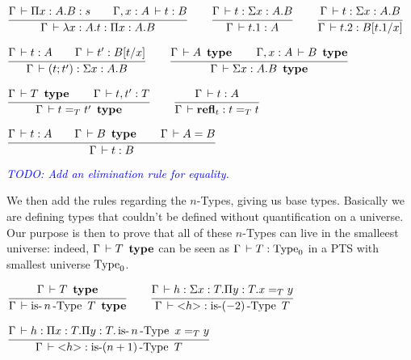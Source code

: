 \documentclass[a4paper,english]{lipics-utf8x}
\newcommand\meta[1]{\noindent\textcolor{blue}{\emph{#1}}}
\begin{document}
  \begin{center}
  \(
    \ru{\Gamma \der \Pi x:A.B : s \qquad
        \Gamma, x:A \der t : B
      }{\Gamma \der \lambda x:A.t : \Pi x:A.B}
    \qquad
    \ru{\Gamma \der t : \Sigma x:A.B
      }{\Gamma \der t.1 : A}
    \qquad
    \ru{\Gamma \der t : \Sigma x:A.B
      }{\Gamma \der t.2 : B[t.1/x]}
  \)
  \end{center}

  \begin{center}
  \(
    \ru{\Gamma \der t : A \qquad
        \Gamma \der t' : B[t/x]
      }{\Gamma \der (t ; t') : \Sigma x:A.B}
    \qquad
    \ru{\Gamma \der A \type \qquad
        \Gamma, x:A \der B \type
      }{\Gamma \der \Sigma x:A.B \type}
  \)
  \end{center}

  \begin{center}
  \(
    \ru{\Gamma \der T \type \qquad
        \Gamma \der t,t' : T
      }{\Gamma \der t =_T t' \type}
    \qquad
    \ru{\Gamma \der t : A
      }{\Gamma \der \refl_t : t =_T t}
  \)
  \end{center}

  \begin{center}
  \(
    \ru{\Gamma \der t : A \qquad
        \Gamma \der B \type \qquad
        \Gamma \der A = B
      }{\Gamma \der t : B}
  \)
  \end{center}

  \meta{TODO: Add an elimination rule for equality.}

  \noindent %
  We then add the rules regarding the $n$-Types, giving us base
  types.
  Basically we are defining types that couldn't be defined without
  quantification on a universe. Our purpose is then to prove
  that all of these $n$-Types can live in the smalleest universe:
  indeed, $\Gamma \,\vdash T \operatorname{\ \mathbf{type}}$ can be seen as
  $\Gamma \,\vdash T : \operatorname{Type}_0$ in a PTS with smallest universe
  $\operatorname{Type}_0$.

  \begin{center}
  \(
    \ru{\Gamma \der T \type
      }{\Gamma \der \isnType{n}{T} \type}
    \qquad
    \ru{%
        \Gamma \der h : \Sigma x:T. \Pi y:T. x =_T y
      }{\Gamma \der {<} h {>} : \isnType{(-2)}{T}}
  \)
  \end{center}

  \begin{center}
  \(
    \ru{%
        \Gamma \der h : \Pi x:T. \Pi y:T. \isnType{n}{x =_T y}
      }{\Gamma \der {<} h {>} : \isnType{(n+1)}{T}}
  \)
  \end{center}
\end{document}
